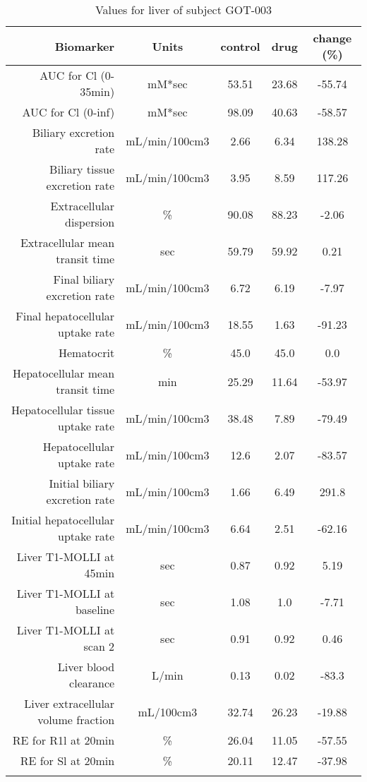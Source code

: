 \documentclass{epflreport}%
\begin{document}
%
\clearpage%
\begin{longtable}{rcccc}%
\hline%
Biomarker&Units&control&drug&change (\%)\\%
\hline%
AUC for Cl (0{-}35min)&mM*sec&53.51&23.68&{-}55.74\\%
AUC for Cl (0{-}inf)&mM*sec&98.09&40.63&{-}58.57\\%
Biliary excretion rate&mL/min/100cm3&2.66&6.34&138.28\\%
Biliary tissue excretion rate&mL/min/100cm3&3.95&8.59&117.26\\%
Extracellular dispersion&\%&90.08&88.23&{-}2.06\\%
Extracellular mean transit time&sec&59.79&59.92&0.21\\%
Final biliary excretion rate&mL/min/100cm3&6.72&6.19&{-}7.97\\%
Final hepatocellular uptake rate&mL/min/100cm3&18.55&1.63&{-}91.23\\%
Hematocrit&\%&45.0&45.0&0.0\\%
Hepatocellular mean transit time&min&25.29&11.64&{-}53.97\\%
Hepatocellular tissue uptake rate&mL/min/100cm3&38.48&7.89&{-}79.49\\%
Hepatocellular uptake rate&mL/min/100cm3&12.6&2.07&{-}83.57\\%
Initial biliary excretion rate&mL/min/100cm3&1.66&6.49&291.8\\%
Initial hepatocellular uptake rate&mL/min/100cm3&6.64&2.51&{-}62.16\\%
Liver T1{-}MOLLI at 45min&sec&0.87&0.92&5.19\\%
Liver T1{-}MOLLI at baseline&sec&1.08&1.0&{-}7.71\\%
Liver T1{-}MOLLI at scan 2&sec&0.91&0.92&0.46\\%
Liver blood clearance&L/min&0.13&0.02&{-}83.3\\%
Liver extracellular volume fraction&mL/100cm3&32.74&26.23&{-}19.88\\%
RE for R1l at 20min&\%&26.04&11.05&{-}57.55\\%
RE for Sl at 20min&\%&20.11&12.47&{-}37.98\\%
\hline%
\caption{Values for liver of subject GOT-003} \\%
\end{longtable}%
\end{document}
